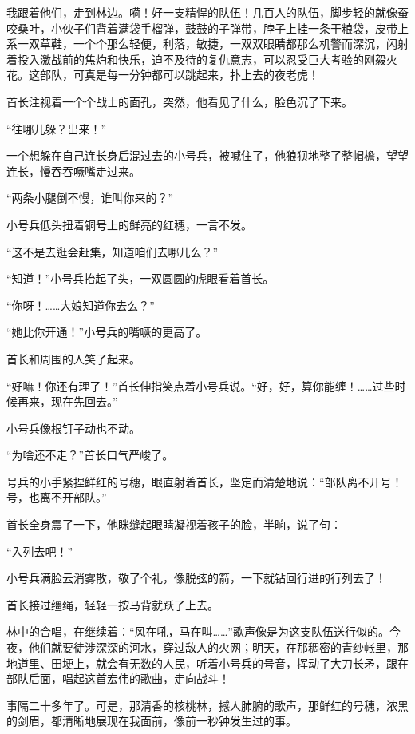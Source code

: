 \documentclass[12pt,UTF-8,openany]{ctexbook}
\begin{document}
\begin{normalsize}
    我跟着他们，走到林边。嗬！好一支精悍的队伍！几百人的队伍，脚步轻的就像蚕咬桑叶，小伙子们背着满袋手榴弹，鼓鼓的子弹带，脖子上挂一条干粮袋，皮带上系一双草鞋，一个个那么轻便，利落，敏捷，一双双眼睛都那么机警而深沉，闪射着投入激战前的焦灼和快乐，迫不及待的复仇意志，可以忍受巨大考验的刚毅火花。这部队，可真是每一分钟都可以跳起来，扑上去的夜老虎！
    
    首长注视着一个个战士的面孔，突然，他看见了什么，脸色沉了下来。
    
    “往哪儿躲？出来！”
    
    一个想躲在自己连长身后混过去的小号兵，被喊住了，他狼狈地整了整帽檐，望望连长，慢吞吞噘嘴走过来。
    
    “两条小腿倒不慢，谁叫你来的？”
    
    小号兵低头扭着铜号上的鲜亮的红穗，一言不发。
    
    “这不是去逛会赶集，知道咱们去哪儿么？”
    
    “知道！”小号兵抬起了头，一双圆圆的虎眼看着首长。
    
    “你呀！……大娘知道你去么？”
    
    “她比你开通！”小号兵的嘴噘的更高了。
    
    首长和周围的人笑了起来。
    
    “好嘛！你还有理了！”首长伸指笑点着小号兵说。“好，好，算你能缠！……过些时候再来，现在先回去。”
    
    小号兵像根钉子动也不动。
    
    “为啥还不走？”首长口气严峻了。
    
    号兵的小手紧捏鲜红的号穗，眼直射着首长，坚定而清楚地说：“部队离不开号！号，也离不开部队。”
    
    首长全身震了一下，他眯缝起眼睛凝视着孩子的脸，半晌，说了句：
    
    “入列去吧！”
    
    小号兵满脸云消雾散，敬了个礼，像脱弦的箭，一下就钻回行进的行列去了！
    
    首长接过缰绳，轻轻一按马背就跃了上去。
    
    林中的合唱，在继续着：“风在吼，马在叫……”歌声像是为这支队伍送行似的。今夜，他们就要徒涉深深的河水，穿过敌人的火网；明天，在那稠密的青纱帐里，那地道里、田埂上，就会有无数的人民，听着小号兵的号音，挥动了大刀长矛，跟在部队后面，唱起这首宏伟的歌曲，走向战斗！
    
    事隔二十多年了。可是，那清香的核桃林，撼人肺腑的歌声，那鲜红的号穗，浓黑的剑眉，都清晰地展现在我面前，像前一秒钟发生过的事。
    

\end{normalsize}
\end{document}
